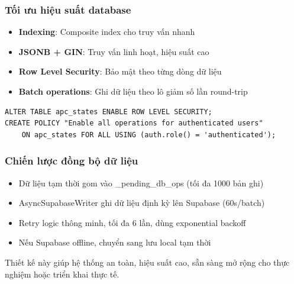 \subsubsection{Tối ưu hiệu suất database}

\begin{itemize}
    \item \textbf{Indexing}: Composite index cho truy vấn nhanh
    \item \textbf{JSONB + GIN}: Truy vấn linh hoạt, hiệu suất cao
    \item \textbf{Row Level Security}: Bảo mật theo từng dòng dữ liệu
    \item \textbf{Batch operations}: Ghi dữ liệu theo lô giảm số lần round-trip
\end{itemize}

\begin{lstlisting}[style=sql]
ALTER TABLE apc_states ENABLE ROW LEVEL SECURITY;
CREATE POLICY "Enable all operations for authenticated users"
    ON apc_states FOR ALL USING (auth.role() = 'authenticated');
\end{lstlisting}

\subsubsection{Chiến lược đồng bộ dữ liệu}

\begin{itemize}
    \item Dữ liệu tạm thời gom vào \_pending\_db\_ops (tối đa 1000 bản ghi)
    \item AsyncSupabaseWriter ghi dữ liệu định kỳ lên Supabase (60s/batch)
    \item Retry logic thông minh, tối đa 6 lần, dùng exponential backoff
    \item Nếu Supabase offline, chuyển sang lưu local tạm thời
\end{itemize}

Thiết kế này giúp hệ thống an toàn, hiệu suất cao, sẵn sàng mở rộng cho thực nghiệm hoặc triển khai thực tế.
